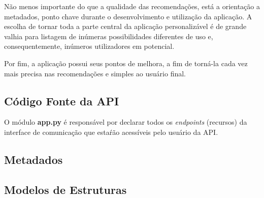 \documentclass[12pt, openright, oneside, a4paper, brazil]{abntex2}
\begin{document}
Não menos importante do que a qualidade das recomendações, está a orientação a metadados, ponto chave durante o desenvolvimento e utilização da aplicação. A escolha de tornar toda a parte central da aplicação personalizável é de grande valhia para listagem de inúmeras possibilidades diferentes de uso e, consequentemente, inúmeros utilizadores em potencial.

Por fim, a aplicação possui seus pontos de melhora, a fim de torná-la cada vez mais precisa nas recomendações e simples ao usuário final.

\postextual



\begin{apendicesenv}

	\chapter{Código Fonte da API} \label{source_code}

	O módulo \textbf{app.py} é responsável por declarar todos os \textit{endpoints} (recursos) da interface de comunicação que estaŕão acessíveis pelo usuário da API.

	

	\section{Metadados}

	

	

	

	\section{Modelos de Estruturas}

	

	

	


\end{apendicesenv}
\end{document}
